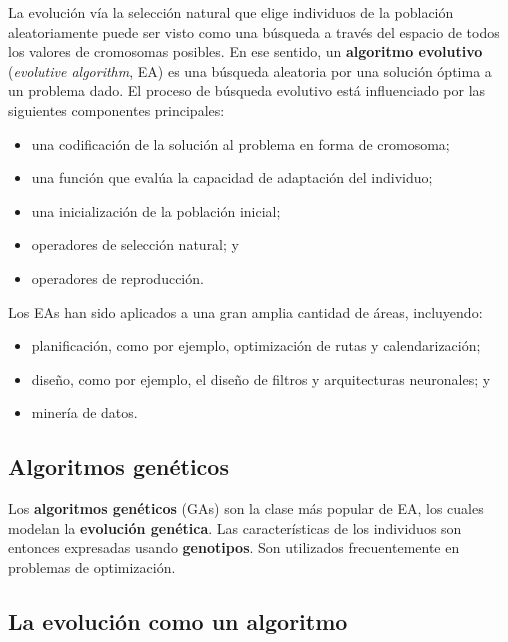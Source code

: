 \documentclass[10pt,a4paper]{article}
\begin{document}
La evolución vía la selección natural que elige individuos de la población aleatoriamente puede ser visto como una búsqueda a través del espacio de todos los valores de cromosomas posibles. En ese sentido, un \textbf{algoritmo evolutivo} (\textit{evolutive algorithm}, EA) es una búsqueda aleatoria por una solución óptima a un problema dado. El proceso de búsqueda evolutivo está influenciado por las siguientes componentes principales:
\begin{itemize}
\item una codificación de la solución al problema en forma de cromosoma;
\item una función que evalúa la capacidad de adaptación del individuo;
\item una inicialización de la población inicial;
\item operadores de selección natural; y 
\item operadores de reproducción.
\end{itemize}

Los EAs han sido aplicados a una gran amplia cantidad de áreas, incluyendo:
\begin{itemize}
\item planificación, como por ejemplo, optimización de rutas y calendarización;
\item diseño, como por ejemplo, el diseño de filtros y arquitecturas neuronales; y
\item minería de datos.
\end{itemize}

\subsection{Algoritmos genéticos}

Los \textbf{algoritmos genéticos} (GAs) son la clase más popular de EA, los cuales modelan la \textbf{evolución genética}. Las características de los individuos son entonces expresadas usando \textbf{genotipos}. Son utilizados frecuentemente en problemas de optimización.

\subsection{La evolución como un algoritmo}
\end{document}
